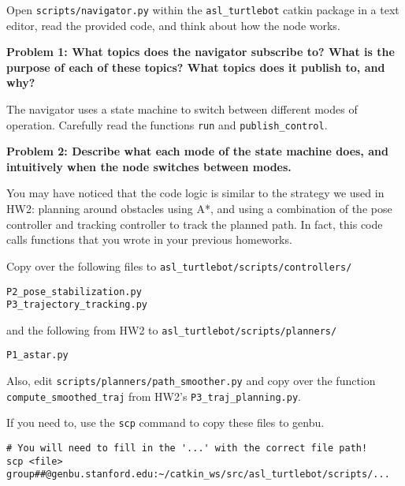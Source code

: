 \documentclass{article}
\begin{document}



Open \texttt{scripts/navigator.py} within the \texttt{asl\_turtlebot} catkin package in a text editor, read the provided code, and think about how the node works.

\textbf{Problem 1: What topics does the navigator subscribe to? What is the purpose of each of these topics? What topics does it publish to, and why?}

The navigator uses a state machine to switch between different modes of operation. Carefully read the functions \texttt{run} and \texttt{publish\_control}.

\textbf{Problem 2: Describe what each mode of the state machine does, and intuitively when the node switches between modes.}

You may have noticed that the code logic is similar to the strategy we used in HW2: planning around obstacles using A*, and using a combination of the pose controller and tracking controller to track the planned path. In fact, this code calls functions that you wrote in your previous homeworks. 

Copy over the following files to \texttt{asl\_turtlebot/scripts/controllers/}

\begin{lstlisting}
P2_pose_stabilization.py
P3_trajectory_tracking.py
\end{lstlisting}

and the following from HW2 to \texttt{asl\_turtlebot/scripts/planners/}

\begin{lstlisting}
P1_astar.py
\end{lstlisting}


Also, edit \texttt{scripts/planners/path\_smoother.py} and copy over the function \texttt{compute\_smoothed\_traj} from HW2's \texttt{P3\_traj\_planning.py}.

If you need to, use the \texttt{scp} command to copy these files to genbu.


\begin{lstlisting}
# You will need to fill in the '...' with the correct file path!
scp <file> group##@genbu.stanford.edu:~/catkin_ws/src/asl_turtlebot/scripts/...
\end{lstlisting}
\end{document}
